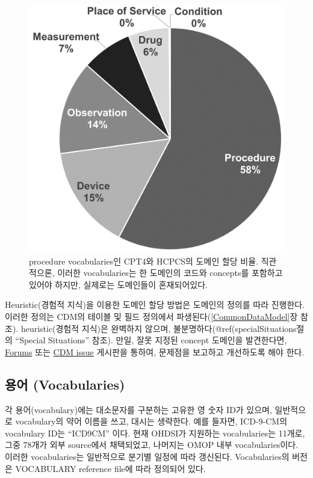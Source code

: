 \documentclass[11pt]{book}
\theoremstyle{definition}
\theoremstyle{definition}
\theoremstyle{definition}
\theoremstyle{remark}
\begin{document}
\begin{figure}

{\centering \includegraphics[width=0.7\linewidth]{images/StandardizedVocabularies/domains} 

}

\caption{procedure vocabularies인 CPT4와 HCPCS의 도메인 할당 비율. 직관적으론, 이러한 vocabularies는 한 도메인의 코드와 concepts를 포함하고 있어야 하지만, 실제로는 도메인들이 혼재되어있다.}\label{fig:domains}
\end{figure}

Heuristic(경험적 지식)을 이용한 도메인 할당 방법은 도메인의 정의를 따라
진행한다. 이러한 정의는 CDM의 테이블 및 필드 정의에서
파생된다(\ref{CommonDataModel}장 참조). heuristic(경험적 지식)은
완벽하지 않으며, 불분명하다(@ref(specialSituations절의 ``Special
Situations'' 참조). 만일, 잘못 지정된 concept 도메인을 발견한다면,
\href{https://forums.ohdsi.org}{Forums} 또는
\href{https://github.com/OHDSI/CommonDataModel/issues}{CDM issue}
게시판을 통하여, 문제점을 보고하고 개선하도록 해야 한다.

\subsection{용어 (Vocabularies)}\label{-vocabularies}

각 용어(vocabulary)에는 대소문자를 구분하는 고유한 영 숫자 ID가 있으며,
일반적으로 vocabulary의 약어 이름을 쓰고, 대시는 생략한다. 예를 들자면,
ICD-9-CM의 vocabulary ID는 ``ICD9CM'' 이다. 현재 OHDSI가 지원하는
vocabularies는 11개로, 그중 78개가 외부 source에서 채택되었고, 나머지는
OMOP 내부 vocabularies이다. 이러한 vocabularies는 일반적으로 분기별
일정에 따라 갱신된다. Vocabularies의 버전은 VOCABULARY reference file에
따라 정의되어 있다. 
\end{document}

